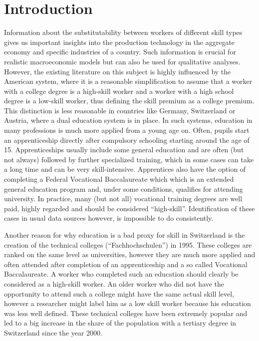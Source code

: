 \documentclass[]{article}
\begin{document}
\section{Introduction}
\label{intro}
Information about the substitutability between workers of different
skill types gives us important insights into the production technology
in the aggregate economy and specific industries of a country. Such
information is crucial for realistic macroeconomic models but can also
be used for qualitative analyses. However, the existing literature on
this subject is highly influenced by the American system, where it is
a reasonable simplification to assume that a worker with a college
degree is a high-skill worker and a worker with a high school degree
is a low-skill worker, thus defining the skill premium as a college
premium. This distinction is less reasonable in countries like
Germany, Switzerland or Austria, where a dual education system is in
place. In such systems, education in many professions is much more
applied from a young age on. Often, pupils start an apprenticeship
directly after compulsory schooling starting around the age of
15. Apprenticeships usually include some general education and are
often (but not always) followed by further specialized training, which
in some cases can take a long time and can be very
skill-intensive. Apprentices also have the option of completing a
Federal Vocational Baccalaureate which which is an extended general
education program and, under some conditions, qualifies for attending
university. In practice, many (but not all) vocational training
degrees are well paid, highly regarded and should be considered
``high-skill''. Identification of these cases in usual data sources
however, is impossible to do consistently.

Another reason for why education is a bad proxy for skill in
Switzerland is the creation of the technical colleges
(``Fachhochschulen'') in 1995. These colleges are ranked on the same
level as universities, however they are much more applied and often
attended after completion of an apprenticeship and a so called
Vocational Baccalaureate. A worker who completed such an education
should clearly be considered as a high-skill worker. An older worker
who did not have the opportunity to attend such a college might have
the same actual skill level, however a researcher might label him as a
low skill worker because his education was less well defined. These
technical colleges have been extremely popular and led to a big
increase in the share of the population with a tertiary degree in
Switzerland since the year 2000.
\end{document}
